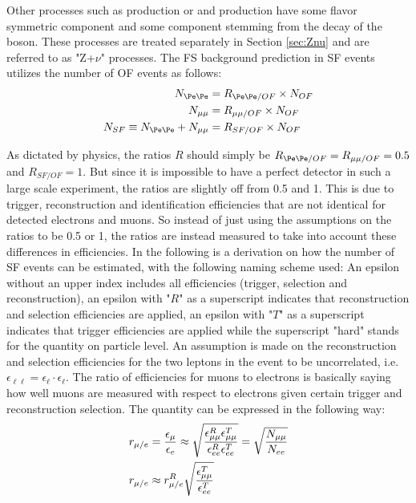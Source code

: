 Other processes such as \PWZ production or \ttZ and \ttH production have some flavor symmetric component and some component stemming from the decay of the \PZ boson.
These processes are treated separately in Section \ref{sec:Znu} and are referred to as "Z+$\nu$" processes. 
The FS background prediction in SF events utilizes the number of OF events as follows:
\begin{align}
\label{eq:masterformula}
    N_{\Pe\Pe} & = R_{\Pe\Pe/OF} \times N_{OF}\notag \\
    N_{\mu\mu} & = R_{\mu\mu/OF} \times N_{OF}\notag\\
    N_{SF} \equiv N_{\Pe\Pe} + N_{\mu\mu} & = R_{SF/OF} \times N_{OF}
\end{align}

As dictated by physics, the ratios $R$ should simply be $R_{\Pe\Pe/OF}=R_{\mu\mu/OF}=0.5$ and $R_{SF/OF}=1$.
But since it is impossible to have a perfect detector in such a large scale experiment, the ratios are slightly off from 0.5 and 1. 
This is due to trigger, reconstruction and identification efficiencies that are not identical for detected electrons and muons. 
So instead of just using the assumptions on the ratios to be 0.5 or 1, the ratios are instead measured to take into account these differences in efficiencies. 
In the following is a derivation on how the number of SF events can be estimated, with the following naming scheme used: 
An epsilon without an upper index includes all efficiencies (trigger, selection and reconstruction), an epsilon with "$R$" as a superscript indicates that reconstruction and selection efficiencies are applied, an epsilon with "$T$" as a superscript indicates that trigger efficiencies are applied while the superscript "hard" stands for the quantity on particle level.
An assumption is made on the reconstruction and selection efficiencies for the two leptons in the event to be uncorrelated, i.e. $\epsilon_{\ell\ell}=\epsilon_{\ell} \cdot \epsilon_{\ell}$. 
The ratio of efficiencies for muons to electrons is basically saying how well muons are measured with respect to electrons given certain trigger and reconstruction selection. 
The quantity can be expressed in the following way:
\begin{align}
\label{eq:rMue}
r_{\mu/e} & = \frac{\epsilon_{\mu}}{\epsilon_{e}} \approx \sqrt{ \frac{\epsilon^{R}_{\mu\mu}\epsilon^{T}_{\mu\mu}}{\epsilon^{R}_{ee}\epsilon^{T}_{ee}}} = \sqrt{ \frac{N_{\mu\mu}}{N_{ee}}} \notag \\
r_{\mu/e} & \approx r^{R}_{\mu/e}\sqrt{ \frac{\epsilon^{T}_{\mu\mu}}{\epsilon^{T}_{ee}}}
\end{align}
